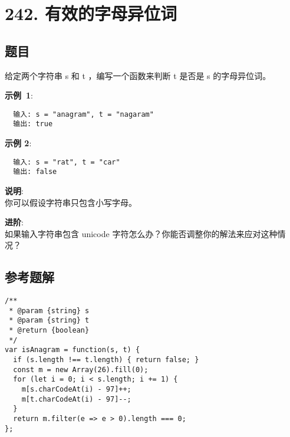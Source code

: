 \newpage
\section{242. 有效的字母异位词} 
\label{leetcode:242}

\subsection{题目}

给定两个字符串 s 和 t ，编写一个函数来判断 t 是否是 s 的字母异位词。

\textbf{示例 1}:

\begin{verbatim}
  输入: s = "anagram", t = "nagaram"
  输出: true
\end{verbatim}

\textbf{示例 2}:

\begin{verbatim}
  输入: s = "rat", t = "car"
  输出: false
\end{verbatim}

\textbf{说明}:\\
你可以假设字符串只包含小写字母。

\textbf{进阶}:\\
如果输入字符串包含 unicode 字符怎么办？你能否调整你的解法来应对这种情况？

\subsection{参考题解}

\begin{verbatim}
/**
 * @param {string} s
 * @param {string} t
 * @return {boolean}
 */
var isAnagram = function(s, t) {
  if (s.length !== t.length) { return false; }
  const m = new Array(26).fill(0);
  for (let i = 0; i < s.length; i += 1) {
    m[s.charCodeAt(i) - 97]++;
    m[t.charCodeAt(i) - 97]--;
  }
  return m.filter(e => e > 0).length === 0;
};
\end{verbatim}
